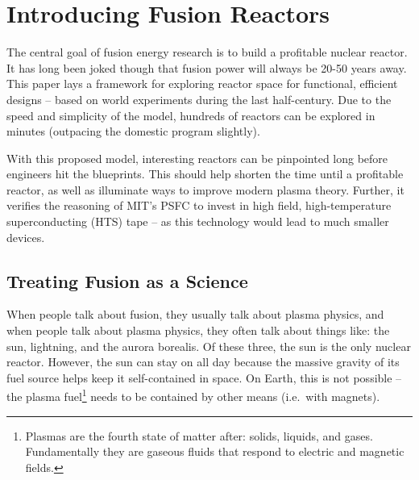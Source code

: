 %
%
%
%
%
%
%
%

\chapter{Introducing Fusion Reactors}

The central goal of fusion energy research is to build a profitable nuclear reactor. It has long been joked though that fusion power will always be 20-50 years away. This paper lays a framework for exploring reactor space for functional, efficient designs -- based on world experiments during the last half-century. Due to the speed and simplicity of the model, hundreds of reactors can be explored in minutes (outpacing the domestic program slightly).

With this proposed model, interesting reactors can be pinpointed long before engineers hit the blueprints. This should help shorten the time until a profitable reactor, as well as illuminate ways to improve modern plasma theory. Further, it verifies the reasoning of MIT's PSFC to invest in high field, high-temperature superconducting (HTS) tape -- as this technology would lead to much smaller devices.

\section{Treating Fusion as a Science}

When people talk about fusion, they usually talk about plasma physics, and when people talk about plasma physics, they often talk about things like: the sun, lightning, and the aurora borealis. Of these three, the sun is the only nuclear reactor. However, the sun can stay on all day because the massive gravity of its fuel source helps keep it self-contained in space. On Earth, this is not possible -- the plasma fuel\footnote{Plasmas are the fourth state of matter after: solids, liquids, and gases. Fundamentally they are gaseous fluids that respond to electric and magnetic fields.} needs to be contained by other means (i.e.\ with magnets).

